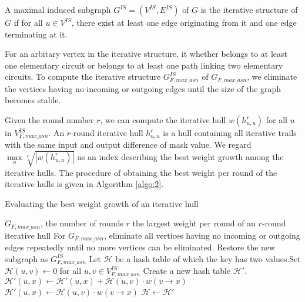 \begin{definition}
	A maximal induced subgraph $G^{IS}=(V^{IS},E^{IS})$ of $G$ is the iterative structure of $G$ if for all $u\in V^{IS}$, there exist at least one edge originating from it and one edge terminating at it.
\end{definition}

For an arbitary vertex in the iterative structure, it whether belongs to at least one elementary circuit or belongs to at least one path linking two elementary circuits. To compute the iterative structure $G^{IS}_{F,max\_asn}$ of $G_{F,max\_asn}$, we eliminate the vertices having no incoming or outgoing edges until the size of the graph becomes stable. 

Given the round number $r$, we can compute the iterative hull $w(h_{u,u}^r)$ for all $u$ in $V^{IS}_{F,max\_asn}$. An $r$-round iterative hull $h_{u,u}^r$ is a hull containing all iterative trails with the same input and output difference of mask value. We regard $\max\limits_{u}\sqrt[r]{|w(h_{u,u}^r)|}$ as an index describing the best weight growth among the iterative hulls. The procedure of obtaining the best weight per round of the iterative hulls is given in Algorithm \ref{algo:2}.


\begin{algorithm}
	\caption{Evaluating the best weight growth of an iterative hull}
	\label{algo:2}
	\begin{algorithmic}[1]
		\Require $G_{F,max\_asn}$, the number of rounds $r$
		\Ensure the largest weight per round of an $r$-round iterative hull
		\Procedure {}{}
		\State For $G_{F,max\_asn}$, eliminate all vertices having no incoming or outgoing edges repeatedly until no more vertices can be eliminated. Restore the new subgraph as $G^{IS}_{F,max\_asn}$
		\State Let $\mathcal{H}$ be a hash table of which the key has two values.Set $\mathcal{H}(u,v)\leftarrow 0$ for all $u,v\in V^{IS}_{F,max\_asn}$
		\State Create a new hash table $\mathcal{H}'$. 
		\State $\mathcal{H}'(u,x)\leftarrow \mathcal{H}'(u,x)+\mathcal{H}(u,v)\cdot w(v\rightarrow x)$
		\Else 
		\State $\mathcal{H}'(u,x)\leftarrow \mathcal{H}(u,v)\cdot w(v\rightarrow x)$
		\EndIf
		\EndFor
		\EndFor
		\State $\mathcal{H}\leftarrow \mathcal{H}'$
		\EndFor
		\State {}
		\EndProcedure
	\end{algorithmic}
\end{algorithm}

